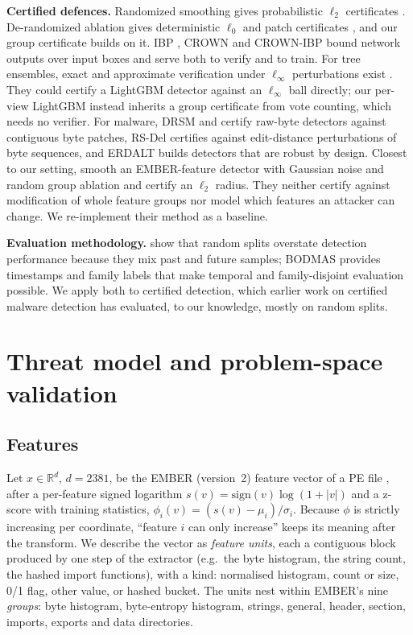 \documentclass[preprint,12pt,authoryear]{elsarticle}
\begin{document}
\textbf{Certified defences.} Randomized smoothing gives probabilistic $\ell_2$ certificates \citep{cohen2019certified,lecuyer2019certified,salman2019provably}. De-randomized ablation gives deterministic $\ell_0$ and patch certificates \citep{levine2020ablation,levine2020patch}, and our group certificate builds on it. IBP \citep{gowal2018ibp}, CROWN \citep{zhang2018crown} and CROWN-IBP \citep{zhang2020crownibp} bound network outputs over input boxes and serve both to verify and to train. For tree ensembles, exact and approximate verification under $\ell_\infty$ perturbations exist \citep{kantchelian2016evasion,chen2019robustness}. They could certify a LightGBM detector against an $\ell_\infty$ ball directly; our per-view LightGBM instead inherits a group certificate from vote counting, which needs no verifier. For malware, DRSM \citep{saha2024drsm} and \citet{gibert2024certified} certify raw-byte detectors against contiguous byte patches, RS-Del \citep{huang2023rsdel} certifies against edit-distance perturbations of byte sequences, and ERDALT \citep{gimenez2025erdalt} builds detectors that are robust by design. Closest to our setting, \citet{giri2026towards} smooth an EMBER-feature detector with Gaussian noise and random group ablation and certify an $\ell_2$ radius. They neither certify against modification of whole feature groups nor model which features an attacker can change. We re-implement their method as a baseline.

\textbf{Evaluation methodology.} \citet{pendlebury2019tesseract} show that random splits overstate detection performance because they mix past and future samples; BODMAS \citep{yang2021bodmas} provides timestamps and family labels that make temporal and family-disjoint evaluation possible. We apply both to certified detection, which earlier work on certified malware detection has evaluated, to our knowledge, mostly on random splits.

\FloatBarrier
\section{Threat model and problem-space validation}\label{sec:threat}
\subsection{Features}
Let $x\in\mathbb{R}^{d}$, $d=2381$, be the EMBER (version~2) feature vector of a PE file \citep{anderson2018ember}, after a per-feature signed logarithm $s(v)=\mathrm{sign}(v)\log(1+|v|)$ and a z-score with training statistics, $\phi_i(v)=(s(v)-\mu_i)/\sigma_i$. Because $\phi$ is strictly increasing per coordinate, ``feature $i$ can only increase'' keeps its meaning after the transform. We describe the vector as \PsNUnits{} \emph{feature units}, each a contiguous block produced by one step of the extractor (e.g.\ the byte histogram, the string count, the hashed import functions), with a kind: normalised histogram, count or size, 0/1 flag, other value, or hashed bucket. The units nest within EMBER's nine \emph{groups}: byte histogram, byte-entropy histogram, strings, general, header, section, imports, exports and data directories.
\end{document}
